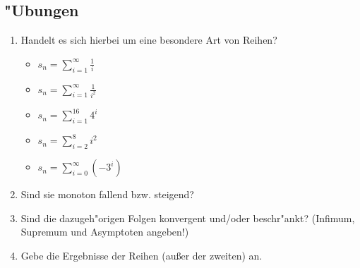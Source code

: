 \subsection{"Ubungen}
\begin{enumerate}
\item Handelt es sich hierbei um eine besondere Art von Reihen?
\begin{itemize}
\item $ s_n = \sum\limits_{i=1}^{\infty} \frac{1}{i} $
\item $ s_n = \sum\limits_{i=1}^{\infty} \frac{1}{i^2} $
\item $ s_n = \sum\limits_{i=1}^{16} 4^i$
\item $ s_n = \sum\limits_{i=2}^{8} i^2 $
\item $ s_n = \sum\limits_{i=0}^{\infty} (-3^i)$
\end{itemize}
\item Sind sie monoton fallend bzw. steigend?
\item Sind die dazugeh"origen Folgen konvergent und/oder beschr"ankt? (Infimum, Supremum und Asymptoten angeben!)
\item Gebe die Ergebnisse der Reihen (außer der zweiten) an.
\end{enumerate}